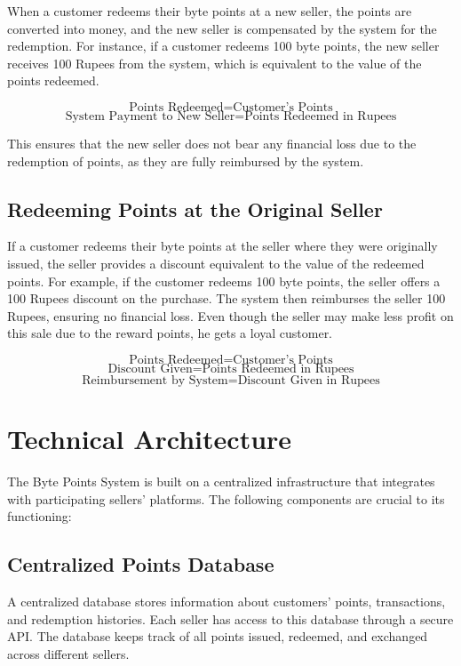 \documentclass[a4paper,12pt]{article}
\begin{document}
When a customer redeems their byte points at a new seller, the points are converted into money, and the new seller is compensated by the system for the redemption. For instance, if a customer redeems 100 byte points, the new seller receives 100 Rupees from the system, which is equivalent to the value of the points redeemed.

\[
\text{Points Redeemed} = \text{Customer's Points}
\]
\[
\text{System Payment to New Seller} = \text{Points Redeemed in Rupees}
\]

This ensures that the new seller does not bear any financial loss due to the redemption of points, as they are fully reimbursed by the system.

\subsection{Redeeming Points at the Original Seller}

If a customer redeems their byte points at the seller where they were originally issued, the seller provides a discount equivalent to the value of the redeemed points. For example, if the customer redeems 100 byte points, the seller offers a 100 Rupees discount on the purchase. The system then reimburses the seller 100 Rupees, ensuring no financial loss. Even though the seller may make less profit on this sale due to the reward points, he gets a loyal customer.

\[
\text{Points Redeemed} = \text{Customer's Points}
\]
\[
\text{Discount Given} = \text{Points Redeemed in Rupees}
\]
\[
\text{Reimbursement by System} = \text{Discount Given in Rupees}
\]

\section{Technical Architecture}

The Byte Points System is built on a centralized infrastructure that integrates with participating sellers' platforms. The following components are crucial to its functioning:

\subsection{Centralized Points Database}
A centralized database stores information about customers' points, transactions, and redemption histories. Each seller has access to this database through a secure API. The database keeps track of all points issued, redeemed, and exchanged across different sellers.
\end{document}
